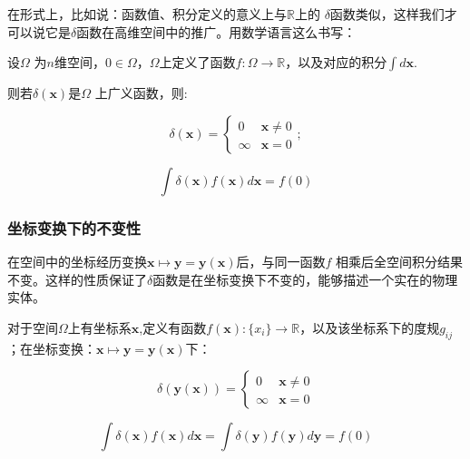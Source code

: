 \documentclass[lang=cn,10pt,newtx,bibend=biber,device=pad]{elegantbook}
\begin{document}
在形式上，比如说：函数值、积分定义的意义上与$\mathbb{R}$上的 $\delta$函数类似，这样我们才可以说它是$\delta$函数在高维空间中的推广。用数学语言这么书写：

\begin{definition}\label{def:delta_highdim}
设$\Omega$ 为$n$维空间，$0 \in\Omega $，$\Omega$上定义了函数$f:\Omega\to\mathbb{R}$，以及对应的积分$\int d\mathbf{x}$.

则若$\delta(\mathbf{x})$是$\Omega$ 上广义函数，则:

\begin{equation}
\delta(\mathbf{x})= \begin{cases} 0&\mathbf{x}\neq0\\ \infty&\mathbf{x}=0 \end{cases};
\end{equation}

\begin{equation}
\int \delta(\mathbf{x})f(\mathbf{x})d\mathbf{x} = f(0)
\end{equation}
\end{definition}

\subsubsection{坐标变换下的不变性}

在空间中的坐标经历变换$\mathbf{x} \mapsto \mathbf{y} = \mathbf{y}(\mathbf{x})$后，与同一函数$f$ 相乘后全空间积分结果不变。这样的性质保证了$\delta$函数是在坐标变换下不变的，能够描述一个实在的物理实体。

\begin{property}[坐标变换下的不变性]
对于空间$\Omega$上有坐标系$\mathbf{x}$,定义有函数$f(\mathbf{x}):\{x_i\}\to\mathbb{R}$，以及该坐标系下的度规$g_{ij}$；在坐标变换：$\mathbf{x} \mapsto \mathbf{y} = \mathbf{y}(\mathbf{x})$下：

\begin{equation}
\delta(\mathbf{y}(\mathbf{x}))=\begin{cases} 0&\mathbf{x}\neq0\\ \infty&\mathbf{x}=0 \end{cases}
\end{equation}

\begin{equation}
\int \delta(\mathbf{x})f(\mathbf{x})d\mathbf{x} = \int \delta(\mathbf{y})f(\mathbf{y})d\mathbf{y} = f(0)
\end{equation}
\end{property}
\end{document}
